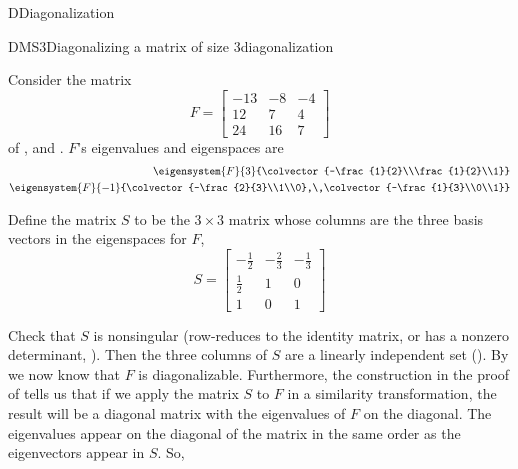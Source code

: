 \begin{subsect}{D}{Diagonalization}
%
\begin{example}{DMS3}{Diagonalizing a matrix of size 3}{diagonalization}
\begin{para}Consider the matrix
%
\begin{equation*}
F=
\begin{bmatrix}
-13 & -8 & -4\\
12 & 7 & 4\\
24 & 16 & 7
\end{bmatrix}
\end{equation*}
%
of ,  and .  $F$'s eigenvalues and eigenspaces are
%
\begin{align*}
\eigensystem{F}{3}{\colvector{-\frac{1}{2}\\\frac{1}{2}\\1}}\\
\eigensystem{F}{-1}{\colvector{-\frac{2}{3}\\1\\0},\,\colvector{-\frac{1}{3}\\0\\1}}
\end{align*}\end{para}
%
\begin{para}Define the matrix $S$ to be the $3\times 3$ matrix whose columns are the three basis vectors in the eigenspaces for $F$,
%
\begin{equation*}
S=
\begin{bmatrix}
-\frac{1}{2} & -\frac{2}{3} & -\frac{1}{3}\\
\frac{1}{2} & 1 & 0\\
1 & 0 & 1
\end{bmatrix}
\end{equation*}
\end{para}
%
\begin{para}Check that $S$ is nonsingular (row-reduces to the identity matrix,  or has a nonzero determinant, ).  Then the three columns of $S$ are a linearly independent set ().  By  we now know that $F$ is diagonalizable.  Furthermore, the construction in the proof of  tells us that if we apply the matrix $S$ to $F$ in a similarity transformation, the result will be a diagonal matrix with the eigenvalues of $F$ on the diagonal.  The eigenvalues appear on the diagonal of the matrix in the same order as the eigenvectors appear in $S$.  So,
%
\begin{align*}

\end{align*}
\end{para}
\end{example}
\end{subsect}
